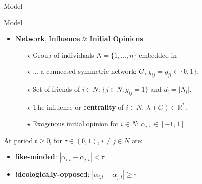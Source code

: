 \documentclass[xcolor=table]{beamer}
\begin{document}
\begin{frame}
\begin{tcolorbox}[enhanced,attach boxed title to top center={yshift=-3mm,yshifttext=-1mm}, colback=red!3,colframe=red!40,colbacktitle=red!40 ,fonttitle=\bfseries, boxed title style={size=small,colframe=red!50} ] 
\centering Model
\end{tcolorbox}
\end{frame}

\begin{frame}{Model}
\begin{itemize}\setlength\itemsep{1em}
	\item {\bf\color{purple}Network}, {\bf\color{purple}Influence} \& {\bf\color{purple}Initial Opinions} 
	\begin{itemize}\setlength\itemsep{1em}
		\item[$\star$] Group of individuals $N = \{ 1, \ldots, n\}$ embedded in
		\item[$\star$] ... a connected symmetric network: $G$, $g_{ij} = g_{ji} \in \{ 0,1\}$.
		\item[$\star$] Set of friends of $i \in N$: $\{ j \in N: g_{ij} =1 \}$ and $d_i = |N_i|$. 
		\item[$\star$] The influence or {\bf\color{purple}centrality} of $i \in N$: $\lambda_i (G) \in \mathbb{R}_{+}^{*}$.
		\item[$\star$] Exogenous initial opinion for $i \in N$: $\alpha_{i,0} \in [-1,1]$
		
	\end{itemize}
	\end{itemize}
	\begin{tcolorbox}[enhanced,attach boxed title to top center={yshift=-3mm,yshifttext=-1mm}, colback=red!3,colframe=red!40,colbacktitle=red!40 ,fonttitle=\bfseries, boxed title style={size=small,colframe=red!50}, title ={Definition} ]  At period $t \geq 0$, for $\tau \in (0,1)$, $i \neq j \in N$ are:
	\begin{itemize}
		\item {\bf\color{purple} like-minded}: $|\alpha_{i,t} - \alpha_{j,t}| < \tau$
		\item {\bf\color{purple} ideologically-opposed}: $|\alpha_{i,t} - \alpha_{j,t}| \geq \tau$
	\end{itemize}
	\end{tcolorbox}

\end{frame}
%
\end{document}
